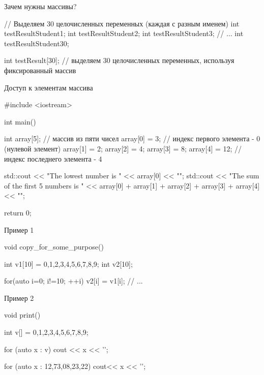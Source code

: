 \documentclass[
    9pt,
    hyperref={pdfencoding=unicode}
    ]{beamer}
\theoremstyle{definition}
\begin{document}
\begin{frame}[fragile]{Зачем нужны массивы?}
    \begin{cppcode}
        // Выделяем 30 целочисленных переменных (каждая с разным именем)
        int testResultStudent1;
        int testResultStudent2;
        int testResultStudent3;
        // ...
        int testResultStudent30;
    \end{cppcode}
    
    \vspace{2em}
    \begin{cppcode}
        int testResult[30]; // выделяем 30 целочисленных переменных, используя фиксированный массив
    \end{cppcode}
\end{frame}


\begin{frame}[fragile]{Доступ к элементам массива}
    \begin{cppcode}
        #include <iostream>
        
        int main()
        {
            int array[5]; // массив из пяти чисел
            array[0] = 3; // индекс первого элемента - 0 (нулевой элемент)
            array[1] = 2;
            array[2] = 4;
            array[3] = 8;
            array[4] = 12; // индекс последнего элемента - 4 
            
            std::cout << "The lowest number is " << array[0] << "\n";
            std::cout << "The sum of the first 5 numbers is " << array[0] + array[1] + array[2] + array[3] + array[4] << "\n";
            
            return 0;
        }
    \end{cppcode}
\end{frame}

\begin{frame}[fragile]{Пример 1}
    \begin{cppcode}
        void copy_for_some_purpose()
        {
            int v1[10] = {0,1,2,3,4,5,6,7,8,9};
            int v2[10];
            
            for(auto i=0; i!=10; ++i)
                v2[i] = v1[i];
            // ...
        }
    \end{cppcode}
\end{frame}


\begin{frame}[fragile]{Пример 2}
    \begin{cppcode}
        void print()
        {
            int v[] = {0,1,2,3,4,5,6,7,8,9};
            
            for (auto x : v)
                cout << x << '\n';
                
            for (auto x : {12,73,08,23,22})
                cout<< x << '\n';    
        }
    \end{cppcode}
\end{frame}
\end{document}

